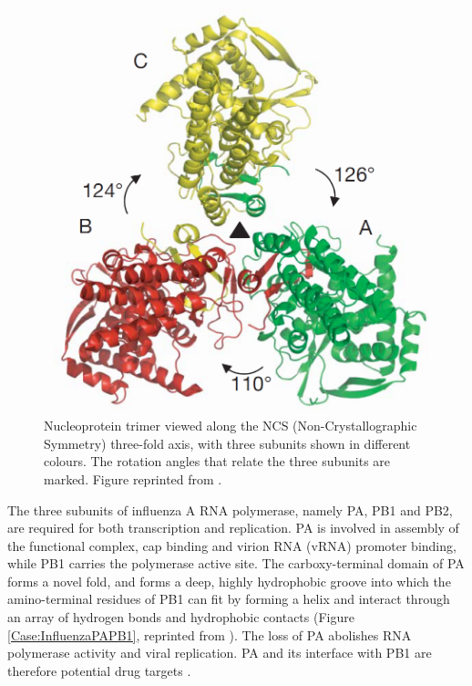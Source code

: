 \begin{figure}
\centering
\includegraphics[width=\linewidth]{Case/InfluenzaNucleoprotein.png}
\caption{Nucleoprotein trimer viewed along the NCS (Non-Crystallographic Symmetry) three-fold axis, with three subunits shown in different colours. The rotation angles that relate the three subunits are marked. Figure reprinted from \citep{1140}.}
\label{Case:InfluenzaNucleoprotein}
\end{figure}

The three subunits of influenza A RNA polymerase, namely PA, PB1 and PB2, are required for both transcription and replication. PA is involved in assembly of the functional complex, cap binding and virion RNA (vRNA) promoter binding, while PB1 carries the polymerase active site. The carboxy-terminal domain of PA forms a novel fold, and forms a deep, highly hydrophobic groove into which the amino-terminal residues of PB1 can fit by forming a helix and interact through an array of hydrogen bonds and hydrophobic contacts (Figure \ref{Case:InfluenzaPAPB1}, reprinted from \citep{1141}). The loss of PA abolishes RNA polymerase activity and viral replication. PA and its interface with PB1 are therefore potential drug targets \citep{1141}.

